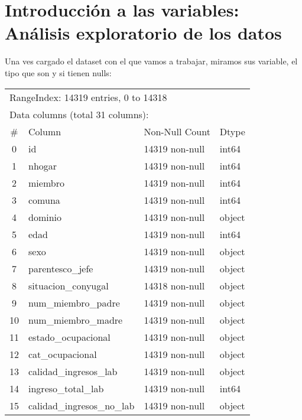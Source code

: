 \documentclass[a4paper]{article}
\begin{document}
\section{Introducción a las variables: Análisis exploratorio de los datos}

    Una ves cargado el dataset con el que vamos a trabajar, miramos sus variable, el tipo que son y si tienen nulls:
    \begin{table}[H]\begin{center}
    \begin{tabular}{clll}
    \multicolumn{4}{l}{RangeIndex: 14319 entries, 0 to 14318} \\
    \multicolumn{4}{l}{Data columns (total 31 columns):}  \\
    \#  & Column                     & Non-Null Count & Dtype \\ \hline
    0  & id                          & 14319 non-null & int64 \\ 
    1  & nhogar                      & 14319 non-null & int64 \\ 
    2  & miembro                     & 14319 non-null & int64 \\ 
    3  & comuna                      & 14319 non-null & int64 \\ 
    4  & dominio                     & 14319 non-null & object \\
    5  & edad                        & 14319 non-null & int64 \\ 
    6  & sexo                        & 14319 non-null & object \\
    7  & parentesco\_jefe             & 14319 non-null & object \\
    8  & situacion\_conyugal          & 14318 non-null & object \\
    9  & num\_miembro\_padre           & 14319 non-null & object \\
    10 & num\_miembro\_madre           & 14319 non-null & object \\
    11 & estado\_ocupacional          & 14319 non-null & object \\
    12 & cat\_ocupacional             & 14319 non-null & object \\
    13 & calidad\_ingresos\_lab        & 14319 non-null & object \\
    14 & ingreso\_total\_lab           & 14319 non-null & int64  \\
    15 & calidad\_ingresos\_no\_lab     & 14319 non-null & object \\

\end{tabular}
\end{center}
\end{table}
\end{document}
